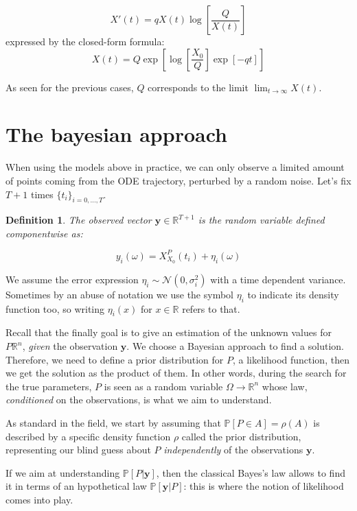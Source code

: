 \documentclass[8pt]{article}
\newtheorem{definition}{Definition}
\begin{document}
\begin{equation}
 X'(t) = q X(t) \log \left [\frac{Q} {X(t)} \right ]
\end{equation}
expressed by the closed-form formula:
\begin{equation}
X(t) = Q \exp	\left [
	\log \left [ \frac{X_0}{Q} \right ]
	\exp \left [ -q t \right ]
		\right ]
\end{equation} 


As seen for the previous cases, $Q$ corresponds to the limit
$\lim_{t \to \infty} X(t)$.


\section {The bayesian approach}
When using the models above in practice, we can only observe a
limited amount of points coming from the ODE trajectory, 
perturbed by a random noise.
Let's fix $T+1$ times $\{t_i\}_{i = 0,\dots, T}$.
\begin{definition}
	The \emph{observed vector} $\textbf{y} \in \mathbb{R}^{T+1}$
	is the random variable defined componentwise as:

\begin{equation}
	y_i(\omega) = X^P_{X_0} (t_i) + \eta_i(\omega)
\end{equation}
\end{definition}
We assume the error expression 
$\eta_i \sim \mathcal{N}(0, \sigma^2_i)$ with a time dependent variance.
Sometimes by an abuse of notation 
we use the symbol $\eta_i$ to indicate its density function too,
so writing $\eta_i(x)$ for $x \in \mathbb{R}$ refers to that.


Recall that the finally goal is to give an estimation
of the unknown values for $P \mathbb{R}^n$,
\emph{given} the observation $\textbf{y}$.
We choose a Bayesian approach to find a solution. Therefore, we need
to define a prior distribution for $P$, a likelihood function,
then we get the solution as the product of them.
In other words,
during the search for the true parameters, $P$ is seen as a random
variable $\Omega \to \mathbb{R}^n$ whose law, 
\emph{conditioned} on the observations,
is what we aim to understand.


As standard in the field, we start by assuming that
$\mathbb{P}[ P \in A] = \rho(A)$ is described by a specific 
density function $\rho$ called the prior distribution, 
representing our blind guess about $P$ \emph{independently} of the 
observations $\textbf{y}$.


If we aim at understanding 
$\mathbb{P}[P | \textbf{y}]$, then the classical Bayes's law allows to find
it in terms of an hypothetical law $\mathbb{P}[\textbf{y} | P]$: this
is where the notion of likelihood comes into play.
\end{document}
